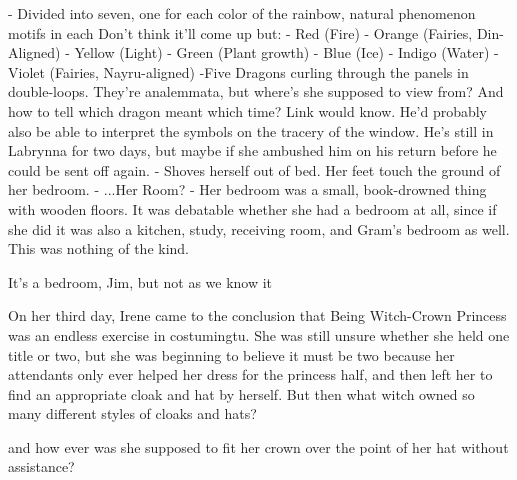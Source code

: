 \documentclass[../FGP.tex]{subfiles}
\begin{document}
\begin{fragment}
 - Divided into seven, one for each color of the rainbow, natural phenomenon motifs in each
    Don't think it'll come up but:
      - Red (Fire)
      - Orange (Fairies, Din-Aligned)
      - Yellow (Light)
      - Green (Plant growth)
      - Blue (Ice)
      - Indigo (Water)
      - Violet (Fairies, Nayru-aligned)
 -Five Dragons curling through the panels in double-loops. They're analemmata, but where's she supposed to view from? And how to tell which dragon meant which time? Link would know. He'd probably also be able to interpret the symbols on the tracery of the window. He's still in Labrynna for two days, but maybe if she ambushed him on his return before he could be sent off again. 
 - Shoves herself out of bed. Her feet touch the ground of her bedroom.
 - ...Her Room?
 - Her bedroom was a small, book-drowned thing with wooden floors. It was debatable whether she had a bedroom at all, since if she did it was also a kitchen, study, receiving room, and Gram's bedroom as well. This was nothing of the kind. 


 It's a bedroom, Jim, but not as we know it







\end{fragment}
\begin{fragment}
On her third day, Irene came to the conclusion that Being Witch-Crown Princess was an endless exercise in costumingtu. She was still unsure whether she held one title or two, but she was beginning to believe it must be two because her attendants only ever helped her dress for the princess half, and then left her to find an appropriate cloak and hat by herself. But then what witch owned so many different styles of cloaks and hats?

and how ever was she supposed to fit her crown over the point of her hat without assistance?
\end{fragment}
\end{document}
